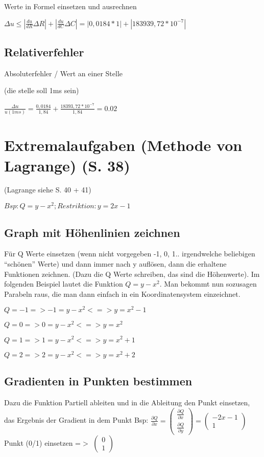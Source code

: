 \documentclass[a4paper, 12pt]{article}
\begin{document}
		Werte in Formel einsetzen und ausrechnen

		$\Delta u \leq |\frac {du} {dR} \Delta R |+| \frac {du} {dC} \Delta C| = |
		0,0184 * 1 |+| 183939,72 * 10^{-7}|$

		\subsection { Relativerfehler}

		Absoluterfehler / Wert an einer Stelle

(die stelle soll 1ms sein)

	$\frac{\Delta u}{u(1ms)} = \frac {0,0184} {1,84} + \frac {18393,72* 10^{-7}}
	{1,84} = 0.02 $

	\newpage
	\section{Extremalaufgaben (Methode von Lagrange) (S. 38)}
(Lagrange siehe S. 40 + 41)

	$Bsp: Q = y - x^2; Restriktion: y = 2x - 1 $

	\subsection{Graph mit Höhenlinien zeichnen}

	Für Q Werte einsetzen (wenn nicht vorgegeben -1, 0, 1.. irgendwelche beliebigen
			``schönen'' Werte) und dann immer nach y auflösen, dann die erhaltene Funktionen
	zeichnen. (Dazu die Q Werte schreiben, das sind die Höhenwerte). Im folgenden
	Beispiel lautet die Funktion $Q = y - x^2$. Man bekommt nun sozusagen Parabeln
	raus, die man dann einfach in ein Koordinatensystem einzeichnet. \newline

	$Q = -1 => -1 = y - x^2 <=> y = x^2 -1$

	$Q = 0 => 0 = y - x^2 <=> y = x^2$

	$Q = 1 => 1 = y - x^2 <=> y = x^2 +1$

	$Q = 2 => 2 = y - x^2 <=> y = x^2 +2$


	\subsection{Gradienten in Punkten bestimmen}

	Dazu die Funktion Partiell ableiten und in die Ableitung den Punkt einsetzen,
	das Ergebnis der Gradient in dem Punkt \newline
	Bsp: $\frac{\partial Q}{\partial x} = 
	\begin{pmatrix}
	\frac{\partial Q}{\partial x} \\
		\frac{\partial Q}{\partial y}
		\end{pmatrix}
		=  
		\begin{pmatrix} 
		-2x-1 \\
			1
			\end{pmatrix}$ \newline
			\newline
			Punkt (0/1) einsetzen =$>$ 
			$\begin{pmatrix}
			0\\
				1
				\end{pmatrix}$ 
\end{document}
